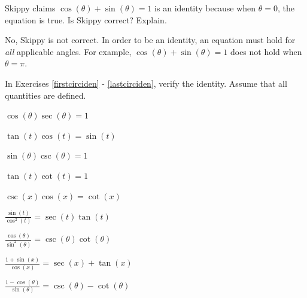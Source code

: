 \documentclass{ximera}
\begin{document}
\begin{problem}
    Skippy claims  $\cos(\theta) + \sin(\theta) = 1$ is an identity because when $\theta = 0$, the equation is true.  Is Skippy correct? Explain.

\begin{solution}
No, Skippy is not correct.  In order to be an identity, an equation must hold for \textit{all} applicable angles.  For example,  $\cos(\theta) + \sin(\theta) = 1$ does not hold when $\theta = \pi$.
\end{solution}
\end{problem}

\begin{question}
In Exercises \ref{firstcirciden} - \ref{lastcirciden}, verify the identity.  Assume that all quantities are defined.

\begin{problem}\label{firstcirciden}
    $\cos(\theta) \sec(\theta) = 1$
\end{problem}

\begin{problem}
    $\tan(t)\cos(t) = \sin(t)$
\end{problem}

\begin{problem}
    $\sin(\theta) \csc(\theta) = 1$
\end{problem}

\begin{problem}
    $\tan(t) \cot(t) = 1$
\end{problem}

\begin{problem}
    $\csc(x) \cos(x) = \cot(x)$
\end{problem}

\begin{problem}
    $\frac{\sin(t)}{\cos^{2}(t)} = \sec(t) \tan(t)$
\end{problem}

\begin{problem}
    $\frac{\cos(\theta)}{\sin^{2}(\theta)} = \csc(\theta) \cot(\theta)$
\end{problem}

\begin{problem}
     $\frac{1+ \sin(x)}{\cos(x)} = \sec(x) + \tan(x)$
\end{problem}

\begin{problem}
    $\frac{1 - \cos(\theta)}{\sin(\theta)} = \csc(\theta) - \cot(\theta)$
\end{problem}


\end{question}
\end{document}
